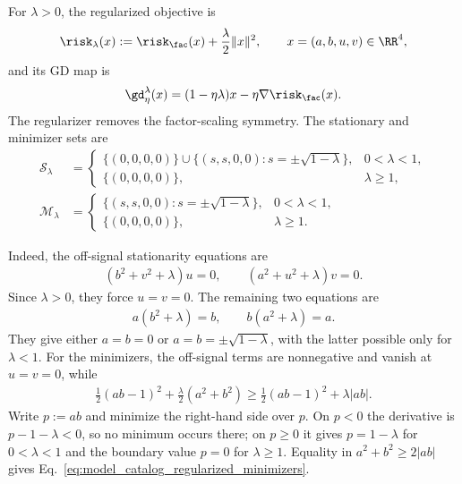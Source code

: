 \documentclass{article}
\begin{document}
For $\lambda>0$, the regularized objective is
\begin{align}
    \risk_\lambda(x)
    :=\risk_\fac(x)+\frac{\lambda}{2}\|x\|^2,
    \qquad
    x=(a,b,u,v)\in\RR^4,
    \label{eq:model_catalog_regularized_loss}
\end{align}
and its GD map is
\begin{align}
    \gd_\eta^\lambda(x)
    =(1-\eta\lambda)x-\eta\nabla\risk_\fac(x).
    \label{eq:model_catalog_regularized_gd}
\end{align}
The regularizer removes the factor-scaling symmetry. The stationary and
minimizer sets are
\begin{align}
    \mathcal S_\lambda
    &=\begin{cases}
        \{(0,0,0,0)\}
        \cup
        \{(s,s,0,0):s=\pm\sqrt{1-\lambda}\},
            &0<\lambda<1,\\
        \{(0,0,0,0)\}, &\lambda\ge1,
    \end{cases}
    \label{eq:model_catalog_regularized_stationary}\\
    \mathcal M_\lambda
    &=\begin{cases}
        \{(s,s,0,0):s=\pm\sqrt{1-\lambda}\},
            &0<\lambda<1,\\
        \{(0,0,0,0)\}, &\lambda\ge1.
    \end{cases}
    \label{eq:model_catalog_regularized_minimizers}
\end{align}

Indeed, the off-signal stationarity equations are
\begin{align}
    (b^2+v^2+\lambda)u=0,
    \qquad
    (a^2+u^2+\lambda)v=0.
\end{align}
Since $\lambda>0$, they force $u=v=0$. The remaining two equations are
\begin{align}
    a(b^2+\lambda)=b,
    \qquad
    b(a^2+\lambda)=a.
\end{align}
They give either $a=b=0$ or $a=b=\pm\sqrt{1-\lambda}$, with the latter possible
only for $\lambda<1$. For the minimizers, the off-signal terms are
nonnegative and vanish at $u=v=0$, while
\begin{align}
    \frac12(ab-1)^2+\frac{\lambda}{2}(a^2+b^2)
    \ge \frac12(ab-1)^2+\lambda|ab|.
\end{align}
Write $p:=ab$ and minimize the right-hand side over $p$. On $p<0$ the
derivative is $p-1-\lambda<0$, so no minimum occurs there; on $p\ge0$ it gives
$p=1-\lambda$ for $0<\lambda<1$ and the boundary value $p=0$ for
$\lambda\ge1$. Equality in
$a^2+b^2\ge2|ab|$ gives
Eq.~\eqref{eq:model_catalog_regularized_minimizers}.
\end{document}
